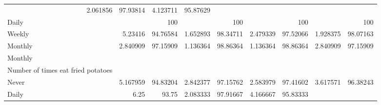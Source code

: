 \documentclass{article}
\begin{document}
\begin{tabular}{lllllllll}
  \multicolumn{1}{r}{2.061856} &
  \multicolumn{1}{r}{97.93814} &
  \multicolumn{1}{r}{4.123711} &
  \multicolumn{1}{r}{95.87629} \\
\multicolumn{1}{l}{\hspace{7em}Daily} &
  \multicolumn{1}{|r}{} &
  \multicolumn{1}{r}{100} &
  \multicolumn{1}{r}{} &
  \multicolumn{1}{r}{100} &
  \multicolumn{1}{r}{} &
  \multicolumn{1}{r}{100} &
  \multicolumn{1}{r}{} &
  \multicolumn{1}{r}{100} \\
\multicolumn{1}{l}{\hspace{7em}Weekly} &
  \multicolumn{1}{|r}{5.23416} &
  \multicolumn{1}{r}{94.76584} &
  \multicolumn{1}{r}{1.652893} &
  \multicolumn{1}{r}{98.34711} &
  \multicolumn{1}{r}{2.479339} &
  \multicolumn{1}{r}{97.52066} &
  \multicolumn{1}{r}{1.928375} &
  \multicolumn{1}{r}{98.07163} \\
\multicolumn{1}{l}{\hspace{7em}Monthly} &
  \multicolumn{1}{|r}{2.840909} &
  \multicolumn{1}{r}{97.15909} &
  \multicolumn{1}{r}{1.136364} &
  \multicolumn{1}{r}{98.86364} &
  \multicolumn{1}{r}{1.136364} &
  \multicolumn{1}{r}{98.86364} &
  \multicolumn{1}{r}{2.840909} &
  \multicolumn{1}{r}{97.15909} \\
\multicolumn{1}{l}{\hspace{5em}Monthly} &
  \multicolumn{1}{|r}{} &
  \multicolumn{1}{r}{} &
  \multicolumn{1}{r}{} &
  \multicolumn{1}{r}{} &
  \multicolumn{1}{r}{} &
  \multicolumn{1}{r}{} &
  \multicolumn{1}{r}{} &
  \multicolumn{1}{r}{} \\
\multicolumn{1}{l}{\hspace{6em}Number of times eat fried potatoes} &
  \multicolumn{1}{|r}{} &
  \multicolumn{1}{r}{} &
  \multicolumn{1}{r}{} &
  \multicolumn{1}{r}{} &
  \multicolumn{1}{r}{} &
  \multicolumn{1}{r}{} &
  \multicolumn{1}{r}{} &
  \multicolumn{1}{r}{} \\
\multicolumn{1}{l}{\hspace{7em}Never} &
  \multicolumn{1}{|r}{5.167959} &
  \multicolumn{1}{r}{94.83204} &
  \multicolumn{1}{r}{2.842377} &
  \multicolumn{1}{r}{97.15762} &
  \multicolumn{1}{r}{2.583979} &
  \multicolumn{1}{r}{97.41602} &
  \multicolumn{1}{r}{3.617571} &
  \multicolumn{1}{r}{96.38243} \\
\multicolumn{1}{l}{\hspace{7em}Daily} &
  \multicolumn{1}{|r}{6.25} &
  \multicolumn{1}{r}{93.75} &
  \multicolumn{1}{r}{2.083333} &
  \multicolumn{1}{r}{97.91667} &
  \multicolumn{1}{r}{4.166667} &
  \multicolumn{1}{r}{95.83333} &

\end{tabular}
\end{document}
